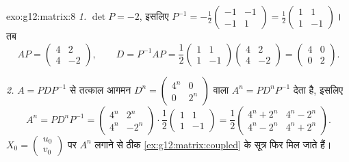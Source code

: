 \begin{solution}{exo:g12:matrix:8}
\emph{1.} $\det P = -2$, इसलिए $P^{-1} = -\frac12\begin{pmatrix} -1 & -1\\ -1 & 1\end{pmatrix}
= \frac12\begin{pmatrix} 1 & 1\\ 1 & -1\end{pmatrix}$। तब
\[
AP = \begin{pmatrix} 4 & 2\\ 4 & -2 \end{pmatrix}, \qquad
D = P^{-1}AP = \frac12\begin{pmatrix} 1&1\\1&-1\end{pmatrix}
\begin{pmatrix} 4&2\\4&-2\end{pmatrix}
= \begin{pmatrix} 4 & 0\\ 0 & 2\end{pmatrix}.
\]

\emph{2.} $A = PDP^{-1}$ से तत्काल आगमन $D^n = \begin{pmatrix} 4^n & 0\\ 0 & 2^n\end{pmatrix}$ वाला $A^n = PD^nP^{-1}$ देता है, इसलिए
\[
A^n = P D^n P^{-1}
= \begin{pmatrix} 4^n & 2^n\\ 4^n & -2^n\end{pmatrix}\cdot
\frac12\begin{pmatrix} 1&1\\1&-1\end{pmatrix}
= \frac12\begin{pmatrix} 4^n + 2^n & 4^n - 2^n\\
4^n - 2^n & 4^n + 2^n\end{pmatrix}.
\]
$X_0 = \begin{pmatrix} u_0\\v_0\end{pmatrix}$ पर $A^n$ लगाने से ठीक \cref{ex:g12:matrix:coupled} के सूत्र फिर मिल जाते हैं।
\end{solution}

